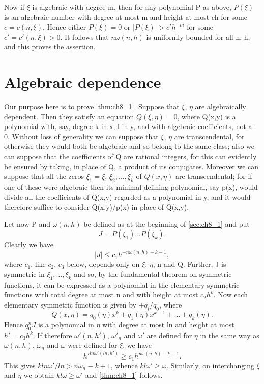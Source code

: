 Now if  $\xi$  is algebraic with degree m, then for any polynomial P as above,  $P(\xi)$  is an algebraic number with degree at most m and height at most ch for some  $c = c(n, \xi)$. Hence either  $P(\xi) = 0$  or  $|P(\xi)| > c'h^{-m}$  for some  $c' = c'(n, \xi) > 0$. It follows that  $n\omega(n, h)$  is uniformly bounded for all n, h, and this proves the assertion.

\section{Algebraic dependence}\label{sec:ch8_3}

Our purpose here is to prove \autoref{thm:ch8_1}. Suppose that  $\xi$, $\eta$ are algebraically dependent. Then they satisfy an equation  $Q(\xi,\eta)=0$, where Q(x,y) is a polynomial with, say, degree k in x, l in y, and with algebraic coefficients, not all 0. Without loss of generality we can suppose that  $\xi$, $\eta$ are transcendental, for otherwise they would both be algebraic and so belong to the same class; also we can suppose that the coefficients of Q are rational integers, for this can evidently be ensured by taking, in place of Q, a product of its conjugates. Moreover we can suppose that all the zeros  $\xi_1 = \xi$, $\xi_2, \ldots, \xi_k$  of  $Q(x, \eta)$  are transcendental; for if one of these were algebraic then its minimal defining polynomial, say p(x), would divide all the coefficients of Q(x,y) regarded as a polynomial in y, and it would therefore suffice to consider Q(x,y)/p(x) in place of Q(x,y).

Let now P and  $\omega(n, h)$  be defined as at the beginning of \autoref{sec:ch8_1} and put
\[J=P(\xi_1)\dots P(\xi_k).\]
Clearly we have
\[|J| \leqslant c_1 h^{-n\omega(n, h)+k-1},\]
where  $c_1$, like  $c_2$,  $c_3$  below, depends only on  $\xi$, $\eta$, n and Q. Further, J is symmetric in  $\xi_1, \ldots, \xi_k$  and so, by the fundamental theorem on symmetric functions, it can be expressed as a polynomial in the elementary symmetric functions with total degree at most n and with height at most  $c_2h^k$. Now each elementary symmetric function is given by  $\pm q_i/q_0$, where
\[Q(x, \eta) = q_0(\eta) x^k + q_1(\eta) x^{k-1} + \ldots + q_k(\eta).\]
Hence  $q_0^n J$  is a polynomial in  $\eta$  with degree at most ln and height at most  $h' = c_3 h^k$. If therefore  $\omega'(n, h')$, $\omega'_n$ and $\omega'$ are defined for $\eta$ in the same way as $\omega(n, h)$, $\omega_n$ and $\omega$ were defined for $\xi$, we have
\[h'^{ln\omega'(ln,h')} \geqslant c_1 h^{n\omega(n,h)-k+1}.\]
This gives $kln\omega'/ln > n\omega_n - k + 1$, whence $kl\omega' \ge \omega$. Similarly, on interchanging $\xi$ and $\eta$ we obtain $kl\omega \ge \omega'$ and \autoref{thm:ch8_1} follows.

